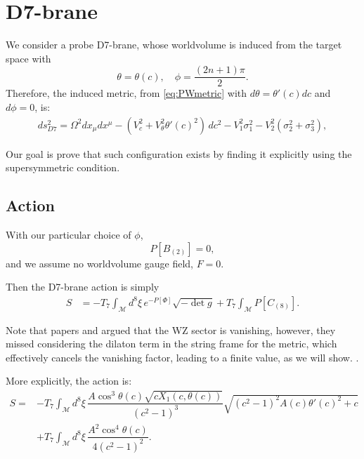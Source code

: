 \section{D7-brane}

We consider a probe D7-brane, whose worldvolume is induced from the target space with 
\begin{equation}
 \theta = \theta(c), \quad \phi=\frac{(2 n + 1)\pi}{2}.
\end{equation}
Therefore, the induced metric, from \eqref{eq:PWmetric} with $d\theta = \theta'(c) dc$ and $d\phi=0$, is:
\begin{align}\label{eq:PWmetric}
ds_{D7}^2 =
\Omega^2 dx_\mu dx^\mu 
- (V_c^2 +V_\theta^2 \theta'(c)^2)\, dc^2 - V_1^2 \sigma_1^2 - V_2^2 (\sigma_2^2 + \sigma_3^2),
\end{align}

Our goal is prove that such configuration exists by finding it explicitly using the supersymmetric condition. 



\subsection{Action}

With our particular choice of $\phi$, 
\begin{equation}
 P[B_{(2)}] = 0,
\end{equation}
and we assume no worldvolume gauge field, $F = 0$. 

Then the D7-brane action is simply
\begin{align}
 S & = -T_7 \int_\mathcal{M} d^8\xi \, e^{-P[\Phi] } \sqrt{-\det g} +
 T_7\int _\mathcal{M} P[C_{(8)}].
\end{align}

Note that papers \cite{Albash:2011nw} and \cite{Evans:2005ti} argued that the WZ sector is vanishing, however, they missed considering the dilaton term in the string frame for the metric, which effectively cancels the vanishing factor, leading to a finite value, as we will show. .

More explicitly, the action is:
\begin{align}\label{eq:ActionWithTheta'}
 S = & -T_7 \int_\mathcal{M} d^8\xi \, \dfrac{A \cos^3\theta (c) \sqrt{c X_1(c, \theta(c))}}{\left(c^2-1\right)^3} \sqrt{\left(c^2-1\right)^2 A(c) \theta '(c)^2+c}\\
 &+
 T_7\int _\mathcal{M} d^8\xi \, \dfrac{A^2 \cos^4\theta(c)}{4 \left(c^2-1\right)^2}.
\end{align}


